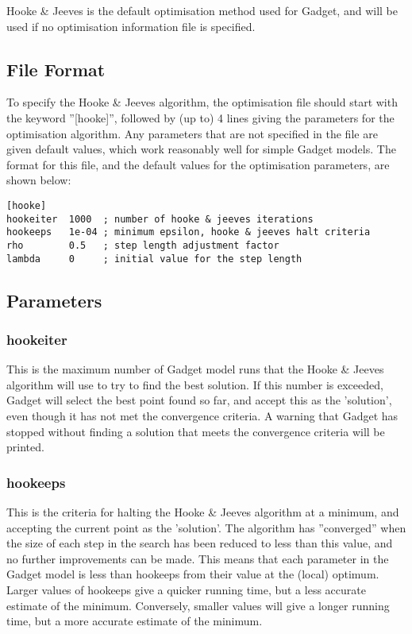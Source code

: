 \documentclass[10pt,twoside]{book}
\begin{document}
\bigskip
Hooke \& Jeeves is the default optimisation method used for Gadget, and will be used if no optimisation information file is specified.

\subsection{File Format}\label{subsec:hookefile}
To specify the Hooke \& Jeeves algorithm, the optimisation file should start with the keyword ''[hooke]'', followed by (up to) 4 lines giving the parameters for the optimisation algorithm.  Any parameters that are not specified in the file are given default values, which work reasonably well for simple Gadget models.  The format for this file, and the default values for the optimisation parameters, are shown below:

{\small\begin{verbatim}
[hooke]
hookeiter  1000  ; number of hooke & jeeves iterations
hookeeps   1e-04 ; minimum epsilon, hooke & jeeves halt criteria
rho        0.5   ; step length adjustment factor
lambda     0     ; initial value for the step length
\end{verbatim}}

\subsection{Parameters}\label{subsec:hookepar}
\subsubsection{hookeiter}
This is the maximum number of Gadget model runs that the Hooke \& Jeeves algorithm will use to try to find the best solution.  If this number is exceeded, Gadget will select the best point found so far, and accept this as the 'solution', even though it has not met the convergence criteria.  A warning that Gadget has stopped without finding a solution that meets the convergence criteria will be printed.

\subsubsection{hookeeps}
This is the criteria for halting the Hooke \& Jeeves algorithm at a minimum, and accepting the current point as the 'solution'.  The algorithm has ''converged'' when the size of each step in the search has been reduced to less than this value, and no further improvements can be made.  This means that each parameter in the Gadget model is less than hookeeps from their value at the (local) optimum.  Larger values of hookeeps give a quicker running time, but a less accurate estimate of the minimum.  Conversely, smaller values will give a longer running time, but a more accurate estimate of the minimum.
\end{document}
